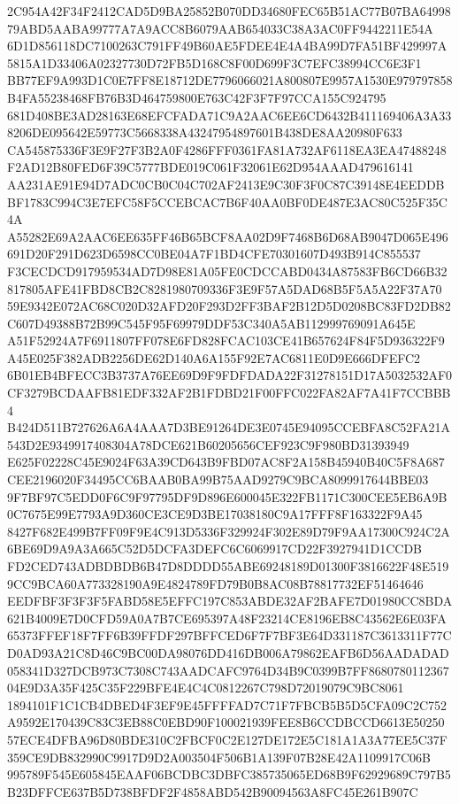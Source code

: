 \documentclass[UTF8,fontset=fandol,zihao=-4,a4paper]{ctexart}
\begin{document}
{{2C954A42F34F2412CAD5D9BA25852B070DD34680FEC65B51AC77B07BA6499879ABD5AABA99777A7A9ACC8B6079AAB654033C38A3AC0FF9442211E54A
6D1D856118DC7100263C791FF49B60AE5FDEE4E4A4BA99D7FA51BF429997A5815A1D33406A02327730D72FB5D168C8F00D699F3C7EFC38994CC6E3F1
BB77EF9A993D1C0E7FF8E18712DE7796066021A800807E9957A1530E979797858B4FA55238468FB76B3D464759800E763C42F3F7F97CCA155C924795
681D408BE3AD28163E68EFCFADA71C9A2AAC6EE6CD6432B411169406A3A338206DE095642E59773C5668338A43247954897601B438DE8AA20980F633
CA545875336F3E9F27F3B2A0F4286FFF0361FA81A732AF6118EA3EA47488248F2AD12B80FED6F39C5777BDE019C061F32061E62D954AAAD479616141
AA231AE91E94D7ADC0CB0C04C702AF2413E9C30F3F0C87C39148E4EEDDBBF1783C994C3E7EFC58F5CCEBCAC7B6F40AA0BF0DE487E3AC80C525F35C4A
A55282E69A2AAC6EE635FF46B65BCF8AA02D9F7468B6D68AB9047D065E496691D20F291D623D6598CC0BE04A7F1BD4CFE70301607D493B914C855537
F3CECDCD917959534AD7D98E81A05FE0CDCCABD0434A87583FB6CD66B32817805AFE41FBD8CB2C8281980709336F3E9F57A5DAD68B5F5A5A22F37A70
59E9342E072AC68C020D32AFD20F293D2FF3BAF2B12D5D0208BC83FD2DB82C607D49388B72B99C545F95F69979DDF53C340A5AB112999769091A645E
A51F52924A7F6911807FF078E6FD828FCAC103CE41B657624F84F5D936322F9A45E025F382ADB2256DE62D140A6A155F92E7AC6811E0D9E666DFEFC2
6B01EB4BFECC3B3737A76EE69D9F9FDFDADA22F31278151D17A5032532AF0CF3279BCDAAFB81EDF332AF2B1FDBD21F00FFC022FA82AF7A41F7CCBBB4
B424D511B727626A6A4AAA7D3BE91264DE3E0745E94095CCEBFA8C52FA21A543D2E9349917408304A78DCE621B60205656CEF923C9F980BD31393949
E625F02228C45E9024F63A39CD643B9FBD07AC8F2A158B45940B40C5F8A687CEE2196020F34495CC6BAAB0BA99B75AAD9279C9BCA8099917644BBE03
9F7BF97C5EDD0F6C9F97795DF9D896E600045E322FB1171C300CEE5EB6A9B0C7675E99E7793A9D360CE3CE9D3BE17038180C9A17FFF8F163322F9A45
8427F682E499B7FF09F9E4C913D5336F329924F302E89D79F9AA17300C924C2A6BE69D9A9A3A665C52D5DCFA3DEFC6C6069917CD22F3927941D1CCDB
FD2CED743ADBDBDB6B47D8DDDD55ABE69248189D01300F3816622F48E5199CC9BCA60A773328190A9E4824789FD79B0B8AC08B78817732EF51464646
EEDFBF3F3F3F5FABD58E5EFFC197C853ABDE32AF2BAFE7D01980CC8BDA621B4009E7D0CFD59A0A7B7CE695397A48F23214CE8196EB8C43562E6E03FA
65373FFEF18F7FF6B39FFDF297BFFCED6F7F7BF3E64D331187C3613311F77CD0AD93A21C8D46C9BC00DA98076DD416DB006A79862EAFB6D56AADADAD
058341D327DCB973C7308C743AADCAFC9764D34B9C0399B7FF868078011236704E9D3A35F425C35F229BFE4E4C4C0812267C798D72019079C9BC8061
1894101F1C1CB4DBED4F3EF9E45FFFFAD7C71F7FBCB5B5D5CFA09C2C752A9592E170439C83C3EB88C0EBD90F100021939FEE8B6CCDBCCD6613E50250
57ECE4DFBA96D80BDE310C2FBCF0C2E127DE172E5C181A1A3A77EE5C37F359CE9DB832990C9917D9D2A003504F506B1A139F07B28E42A1109917C06B
995789F545E605845EAAF06BCDBC3DBFC385735065ED68B9F62929689C797B5B23DFFCE637B5D738BFDF2F4858ABD542B90094563A8FC45E261B907C
}}
\end{document}
